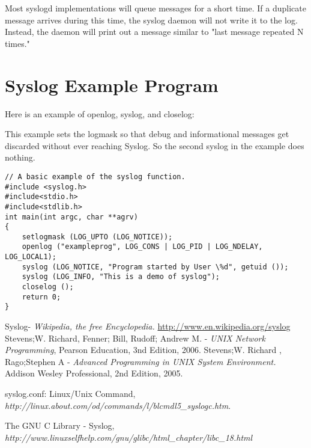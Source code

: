 \documentclass[12pt]{article} %
\begin{document}
Most syslogd implementations will queue messages for a short time. If a duplicate message arrives during this time, the syslog daemon will not write it to the log. Instead, the daemon will print out a message similar to "last message repeated N times."

\section{Syslog Example Program}
Here is an example of openlog, syslog, and closelog:

This example sets the logmask so that debug and informational messages get discarded without ever reaching Syslog. So the second syslog in the example does nothing.


\begin{verbatim}
// A basic example of the syslog function.
#include <syslog.h>
#include<stdio.h>
#include<stdlib.h>
int main(int argc, char **agrv)
{
	setlogmask (LOG_UPTO (LOG_NOTICE));
	openlog ("exampleprog", LOG_CONS | LOG_PID | LOG_NDELAY, LOG_LOCAL1);
	syslog (LOG_NOTICE, "Program started by User \%d", getuid ());
	syslog (LOG_INFO, "This is a demo of syslog");
	closelog ();
	return 0;
}
\end{verbatim}

\begin{thebibliography}{9}
Syslog-
  \emph{Wikipedia, the free Encyclopedia.}
 \url{http://www.en.wikipedia.org/syslog}
Stevens;W. Richard, Fenner; Bill, Rudoff; Andrew M. -
\emph{UNIX Network Programming},
Pearson Education,
  3nd Edition,
  2006.
Stevens;W. Richard , Rago;Stephen A -  
\emph{Advanced Programming in UNIX System Environment.}
Addison Wesley Professional,
  2nd Edition,
  2005.

syslog.conf: Linux/Unix Command,\\
\emph{http://linux.about.com/od/commands/l/blcmdl5\_syslogc.htm}.

The GNU C Library - Syslog,\\
\emph{http://www.linuxselfhelp.com/gnu/glibc/html\_chapter/libc\_18.html}

\end{thebibliography}
\end{document}
